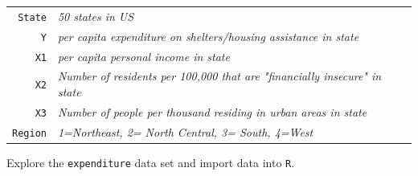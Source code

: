 \documentclass[12pt,letterpaper]{article}
\begin{document}
\begin{tabular}{r|l}
	\texttt{State} &\emph{50 states in US} \\
	\texttt{Y} & \emph{per capita expenditure on shelters/housing assistance in state}\\
	\texttt{X1} &\emph{per capita personal income in state} \\
	\texttt{X2} &  \emph{Number of residents per 100,000 that are "financially insecure" in state}\\
	\texttt{X3} &  \emph{Number of people per thousand residing in urban areas in state} \\
	\texttt{Region} &  \emph{1=Northeast, 2= North Central, 3= South, 4=West} \\
\end{tabular}

\vspace{.5cm}
\noindent Explore the \texttt{expenditure} data set and import data into \texttt{R}.
\vspace{.5cm}
  
\vspace{.5cm}
\end{document}

